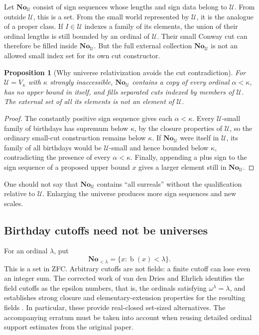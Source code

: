 \documentclass[11pt,letterpaper]{article}
\numberwithin{equation}{section}
\newtheorem{proposition}[theorem]{Proposition}
\theoremstyle{definition}
\theoremstyle{remark}
\newcommand{\No}{\mathbf{No}}
\newcommand{\U}{\mathcal U}
\newcommand{\bd}{\operatorname{b}}
\begin{document}
Let $\No_\U$ consist of sign sequences whose lengths and sign data belong to $\U$. From outside $\U$, this is a set. From the small world represented by $\U$, it is the analogue of a proper class. If $I\in\U$ indexes a family of its elements, the union of their ordinal lengths is still bounded by an ordinal of $\U$. Their small Conway cut can therefore be filled inside $\No_\U$. But the full external collection $\No_\U$ is not an allowed small index set for its own cut constructor.

\begin{proposition}[Why universe relativization avoids the cut contradiction]\label{prop:universe}
For $\U=V_\kappa$ with $\kappa$ strongly inaccessible, $\No_\U$ contains a copy of every ordinal $\alpha<\kappa$, has no upper bound in itself, and fills separated cuts indexed by members of $\U$. The external set of all its elements is not an element of $\U$.
\end{proposition}
\begin{proof}
The constantly positive sign sequence gives each $\alpha<\kappa$. Every $\U$-small family of birthdays has supremum below $\kappa$, by the closure properties of $\U$, so the ordinary small-cut construction remains below $\kappa$. If $\No_\U$ were itself in $\U$, its family of all birthdays would be $\U$-small and hence bounded below $\kappa$, contradicting the presence of every $\alpha<\kappa$. Finally, appending a plus sign to the sign sequence of a proposed upper bound $x$ gives a larger element still in $\No_\U$.
\end{proof}
One should not say that $\No_\U$ contains ``all surreals'' without the qualification relative to $\U$. Enlarging the universe produces more sign sequences and new scales.

\subsection{Birthday cutoffs need not be universes}
For an ordinal $\lambda$, put
\[
\No_{<\lambda}=\{x:\bd(x)<\lambda\}.
\]
This is a set in ZFC. Arbitrary cutoffs are not fields: a finite cutoff can lose even an integer sum. The corrected work of van den Dries and Ehrlich identifies the field cutoffs as the epsilon numbers, that is, the ordinals satisfying $\omega^\lambda=\lambda$, and establishes strong closure and elementary-extension properties for the resulting fields \cite{vdDE,vdDEerratum}. In particular, these provide real-closed set-sized alternatives. The accompanying erratum must be taken into account when reusing detailed ordinal support estimates from the original paper.
\end{document}
